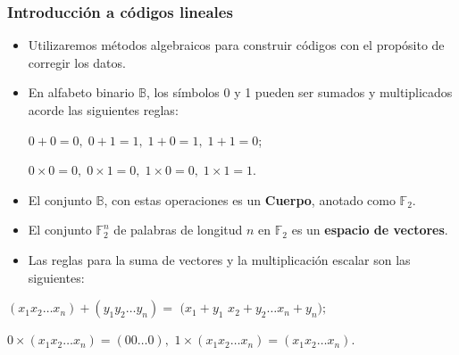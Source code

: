 \documentclass{beamer}
\theoremstyle{plain}
\theoremstyle{example}
\theoremstyle{example}
\begin{document}
\begin{frame} \frametitle{Introducción a códigos lineales} \footnotesize  

\begin{itemize} 
\item  Utilizaremos métodos algebraicos para construir códigos con el propósito de corregir los datos.
\item En alfabeto binario $\mathbb{B}$, los símbolos 0 y 1 pueden ser sumados y multiplicados acorde las siguientes reglas:

\begin{center}
$0+0=0, \; 0+1=1, \; 1+0=1, \;1+1=0$;
\end{center}
\begin{center}
$0\times 0=0, \; 0\times 1=0, \; 1\times 0=0, \; 1\times 1=1$.
\end{center}

\item  El conjunto $\mathbb{B}$, con estas operaciones es un \textbf{Cuerpo}, anotado como $\mathbb{F}_2$.

\item El conjunto $\mathbb{F}^n_2$ de palabras de longitud $n$ en $\mathbb{F}_2$ es un \textbf{espacio de vectores}. 

\item Las reglas para la suma de vectores y la multiplicación escalar son las siguientes:
\end{itemize} 

\begin{center}
$(x_1x_2 \ldots x_n)+(y_1y_2 \ldots y_n)=$ $(x_1+y_1$  $x_2+y_2 \ldots x_n+y_n); $
\end{center}

\begin{center}
$0\times (x_1x_2 \ldots x_n) = (00\ldots 0),	$
$1\times (x_1x_2 \ldots x_n) = (x_1x_2 \ldots x_n).$
\end{center}
\end{frame} 
\end{document}

